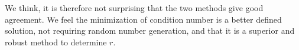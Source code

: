 We think, it is therefore not surprising that the two methods give good
agreement. We feel the minimization of condition number is a better
defined solution, not requiring random number generation, and that it
is a superior and robust method to determine $r$.

















